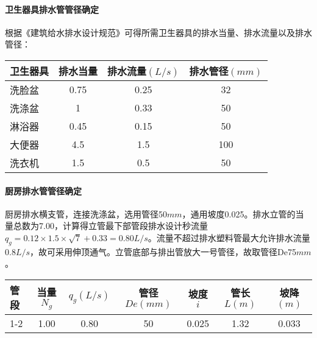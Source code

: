 \documentclass{gdutart}
\begin{document}
        \paragraph{卫生器具排水管管径确定}
          根据《建筑给水排水设计规范》可得所需卫生器具的排水当量、排水流量以及排水管径：
          \begin{center}
            \begin{tabularx}{\textwidth}{|Y|c|c|c|}
              \hline
              卫生器具 & 排水当量 & 排水流量$(L/s)$ & 排水管径$(mm)$\\
              \hline
              洗脸盆   & 0.75  & 0.25  & 32\\
              \hline
              洗涤盆   & 1     & 0.33  & 50\\
              \hline
              淋浴器   & 0.45  & 0.15  & 50\\
              \hline
              大便器   & 4.5   & 1.5   & 100\\
              \hline
              洗衣机 & 1.5   & 0.5   & 50\\
              \hline
            \end{tabularx}
          \end{center}

        \paragraph{厨房排水管管径确定}
          厨房排水横支管，连接洗涤盆，选用管径50$mm$，通用坡度0.025。排水立管的当量总数为7.00，计算得立管最下部管段排水设计秒流量$q_g = 0.12 \times 1.5 \times \sqrt{7} + 0.33 = 0.80L/s$。流量不超过排水塑料管最大允许排水流量$0.8L/s$，故可采用伸顶通气。立管底部与排出管放大一号管径，故取管径De75$mm$。
          \begin{center}
            \begin{tabularx}{\textwidth}{|Y|*{6}{c|}}
              \hline
              管段 & 当量$N_g$ & $q_g(L/s)$ & 管径$De(mm)$ & 坡度$i$ & 管长$L(m)$ & 坡降$(m)$\\
              -2 & 1.00 & 0.80 & 50 & 0.025 & 1.32 & 0.033 \\
              \hline
            \end{tabularx}
          \end{center}
\end{document}
